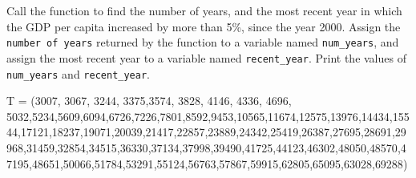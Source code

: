 \documentclass[
  letterpaper,
  DIV=11,
  numbers=noendperiod]{scrreprt}
\newenvironment{Shaded}{\begin{snugshade}}{\end{snugshade}}
\newcommand{\DecValTok}[1]{\textcolor[rgb]{0.68,0.00,0.00}{#1}}
\newcommand{\NormalTok}[1]{\textcolor[rgb]{0.00,0.23,0.31}{#1}}
\newcommand{\OperatorTok}[1]{\textcolor[rgb]{0.37,0.37,0.37}{#1}}
\begin{document}
Call the function to find the number of years, and the most recent year
in which the GDP per capita increased by more than 5\%, since the year
2000. Assign the \texttt{number\ of\ years} returned by the function to
a variable named \texttt{num\_years}, and assign the most recent year to
a variable named \texttt{recent\_year}. Print the values of
\texttt{num\_years} and \texttt{recent\_year}.

\begin{Shaded}
\begin{Highlighting}[]
\NormalTok{T }\OperatorTok{=}\NormalTok{ (}\DecValTok{3007}\NormalTok{, }\DecValTok{3067}\NormalTok{, }\DecValTok{3244}\NormalTok{, }\DecValTok{3375}\NormalTok{,}\DecValTok{3574}\NormalTok{, }\DecValTok{3828}\NormalTok{, }\DecValTok{4146}\NormalTok{, }\DecValTok{4336}\NormalTok{, }\DecValTok{4696}\NormalTok{, }\DecValTok{5032}\NormalTok{,}\DecValTok{5234}\NormalTok{,}\DecValTok{5609}\NormalTok{,}\DecValTok{6094}\NormalTok{,}\DecValTok{6726}\NormalTok{,}\DecValTok{7226}\NormalTok{,}\DecValTok{7801}\NormalTok{,}\DecValTok{8592}\NormalTok{,}\DecValTok{9453}\NormalTok{,}\DecValTok{10565}\NormalTok{,}\DecValTok{11674}\NormalTok{,}\DecValTok{12575}\NormalTok{,}\DecValTok{13976}\NormalTok{,}\DecValTok{14434}\NormalTok{,}\DecValTok{15544}\NormalTok{,}\DecValTok{17121}\NormalTok{,}\DecValTok{18237}\NormalTok{,}\DecValTok{19071}\NormalTok{,}\DecValTok{20039}\NormalTok{,}\DecValTok{21417}\NormalTok{,}\DecValTok{22857}\NormalTok{,}\DecValTok{23889}\NormalTok{,}\DecValTok{24342}\NormalTok{,}\DecValTok{25419}\NormalTok{,}\DecValTok{26387}\NormalTok{,}\DecValTok{27695}\NormalTok{,}\DecValTok{28691}\NormalTok{,}\DecValTok{29968}\NormalTok{,}\DecValTok{31459}\NormalTok{,}\DecValTok{32854}\NormalTok{,}\DecValTok{34515}\NormalTok{,}\DecValTok{36330}\NormalTok{,}\DecValTok{37134}\NormalTok{,}\DecValTok{37998}\NormalTok{,}\DecValTok{39490}\NormalTok{,}\DecValTok{41725}\NormalTok{,}\DecValTok{44123}\NormalTok{,}\DecValTok{46302}\NormalTok{,}\DecValTok{48050}\NormalTok{,}\DecValTok{48570}\NormalTok{,}\DecValTok{47195}\NormalTok{,}\DecValTok{48651}\NormalTok{,}\DecValTok{50066}\NormalTok{,}\DecValTok{51784}\NormalTok{,}\DecValTok{53291}\NormalTok{,}\DecValTok{55124}\NormalTok{,}\DecValTok{56763}\NormalTok{,}\DecValTok{57867}\NormalTok{,}\DecValTok{59915}\NormalTok{,}\DecValTok{62805}\NormalTok{,}\DecValTok{65095}\NormalTok{,}\DecValTok{63028}\NormalTok{,}\DecValTok{69288}\NormalTok{)}
\end{Highlighting}
\end{Shaded}
\end{document}

